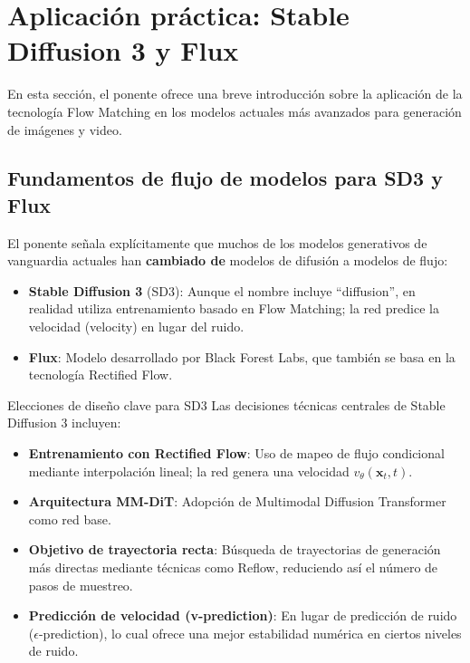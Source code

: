 \documentclass[a4paper]{article}
\begin{document}
\section{Aplicación práctica: Stable Diffusion 3 y Flux}

En esta sección, el ponente ofrece una breve introducción sobre la aplicación de la tecnología Flow Matching en los modelos actuales más avanzados para generación de imágenes y video.

\subsection{Fundamentos de flujo de modelos para SD3 y Flux}

El ponente señala explícitamente que muchos de los modelos generativos de vanguardia actuales han \textbf{cambiado de} modelos de difusión a modelos de flujo:

\begin{itemize}
    \item \textbf{Stable Diffusion 3} (SD3): Aunque el nombre incluye ``diffusion'', en realidad utiliza entrenamiento basado en Flow Matching; la red predice la velocidad (velocity) en lugar del ruido.
    \item \textbf{Flux}: Modelo desarrollado por Black Forest Labs, que también se basa en la tecnología Rectified Flow.
\end{itemize}

\begin{importantbox}{Elecciones de diseño clave para SD3}
Las decisiones técnicas centrales de Stable Diffusion 3 incluyen:
\begin{itemize}
    \item \textbf{Entrenamiento con Rectified Flow}: Uso de mapeo de flujo condicional mediante interpolación lineal; la red genera una velocidad $v_\theta(\mathbf{x}_t, t)$.
    \item \textbf{Arquitectura MM-DiT}: Adopción de Multimodal Diffusion Transformer como red base.
    \item \textbf{Objetivo de trayectoria recta}: Búsqueda de trayectorias de generación más directas mediante técnicas como Reflow, reduciendo así el número de pasos de muestreo.
    \item \textbf{Predicción de velocidad (v-prediction)}: En lugar de predicción de ruido ($\epsilon$-prediction), lo cual ofrece una mejor estabilidad numérica en ciertos niveles de ruido.
\end{itemize}
\end{importantbox}
\end{document}

